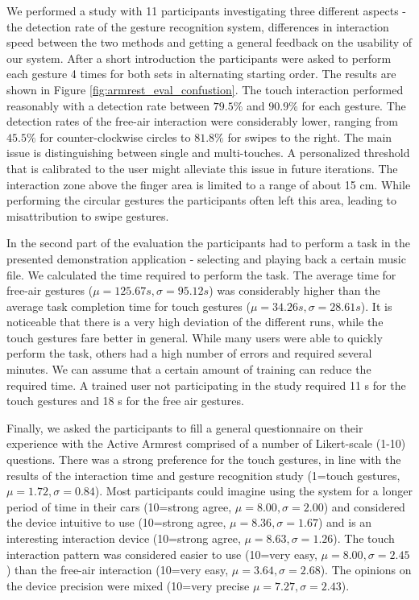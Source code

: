 We performed a study with 11 participants investigating three different aspects - the detection rate of the gesture recognition system, differences in interaction speed between the two methods and getting a general feedback on the usability of our system. After a short introduction the participants were asked to perform each gesture 4 times for both sets in alternating starting order. The results are shown in Figure \ref{fig:armrest_eval_confustion}. The touch interaction performed reasonably with a detection rate between $79.5\%$ and $90.9\%$ for each gesture. The detection rates of the free-air interaction were considerably lower, ranging from $45.5\%$ for counter-clockwise circles to $81.8\%$ for swipes to the right. The main issue is distinguishing between single and multi-touches. A personalized threshold that is calibrated to the user might alleviate this issue in future iterations. The interaction zone above the finger area is limited to a range of about 15 cm. While performing the circular gestures the participants often left this area, leading to misattribution to swipe gestures.

In the second part of the evaluation the participants had to perform a task in the presented demonstration application - selecting and playing back a certain music file. We calculated the time required to perform the task. The average time for free-air gestures ($\mu=125.67s, \sigma=95.12s$) was considerably higher than the average task completion time for touch gestures ($\mu=34.26s, \sigma=28.61s$). It is noticeable that there is a very high deviation of the different runs, while the touch gestures fare better in general. While many users were able to quickly perform the task, others had a high number of errors and required several minutes. We can assume that a certain amount of training can reduce the required time. A trained user not participating in the study required 11 s for the touch gestures and 18 s for the free air gestures.

Finally, we asked the participants to fill a general questionnaire on their experience with the Active Armrest comprised of a number of Likert-scale (1-10) questions. There was a strong preference for the touch gestures, in line with the results of the interaction time and gesture recognition study (1=touch gestures, $\mu=1.72, \sigma=0.84$). Most participants could imagine using the system for a longer period of time in their cars (10=strong agree, $\mu=8.00, \sigma=2.00$) and considered the device intuitive to use (10=strong agree, $\mu=8.36, \sigma=1.67$) and is an interesting interaction device (10=strong agree, $\mu=8.63, \sigma=1.26$). The touch interaction pattern was considered easier to use (10=very easy, $\mu=8.00, \sigma=2.45$) than the free-air interaction (10=very easy, $\mu=3.64, \sigma=2.68$). The opinions on the device precision were mixed (10=very precise $\mu=7.27, \sigma=2.43$).

